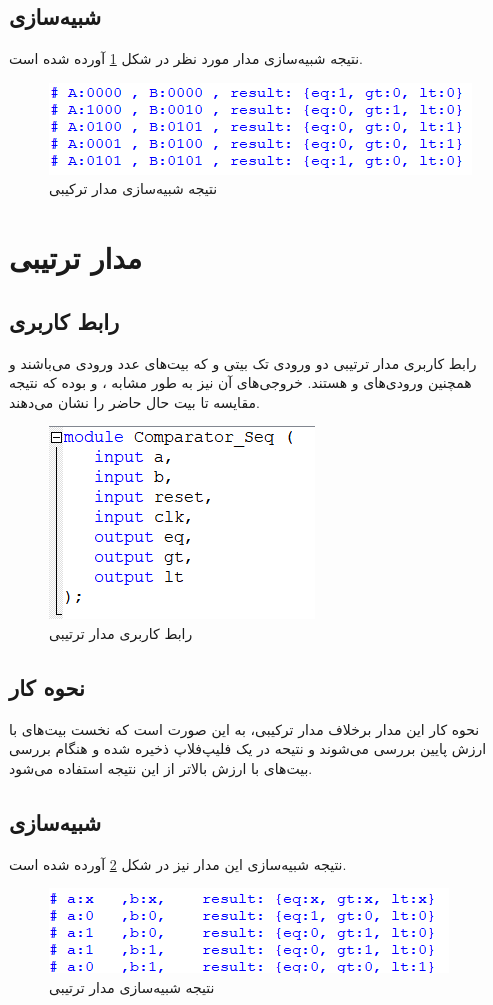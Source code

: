 \documentclass[12pt,onecolumn,a4paper,fleqn]{article}
\begin{document}
	\subsection{شبیه‌سازی}
	نتیجه شبیه‌سازی مدار مورد نظر در شکل \ref{fig:sim_comb} آورده شده است.
	\begin{figure}[H]
	\centering
	\includegraphics[scale=1.2]{source/sim_comb.png}
	\caption{نتیجه شبیه‌سازی مدار ترکیبی}
	\label{fig:sim_comb}
	\end{figure}
	\pagebreak
	\section{مدار ترتیبی}
	\subsection{رابط کاربری}
	رابط کاربری مدار ترتیبی دو ورودی تک بیتی 
	و
	که بیت‌های عدد ورودی می‌باشند
	و همچنین ورودی‌های 
	و
	هستند. خروجی‌های آن نیز به طور مشابه
	،
	و
	بوده که نتیجه مقایسه تا بیت حال حاضر را نشان می‌دهند.
	\begin{figure}[H]
		\centering
		\includegraphics[scale=0.95]{source/interface_seq.png}
		\caption{رابط کاربری مدار ترتیبی}
	\end{figure}
	\subsection{نحوه کار}
	نحوه کار این مدار برخلاف مدار ترکیبی، به این صورت است که نخست بیت‌های با ارزش پایین بررسی می‌شوند و نتیحه در یک فلیپ‌فلاپ ذخیره شده و هنگام بررسی بیت‌های با ارزش بالاتر از این نتیجه استفاده می‌شود.
	\subsection{شبیه‌سازی}
	نتیجه شبیه‌سازی این مدار نیز در شکل \ref{fig:sim_seq} آورده شده است.
	\begin{figure}[H]
		\centering
		\includegraphics[scale=1.2]{source/sim_seq.png}
		\caption{نتیجه شبیه‌سازی مدار ترتیبی}
		\label{fig:sim_seq}
	\end{figure}
\end{document}
